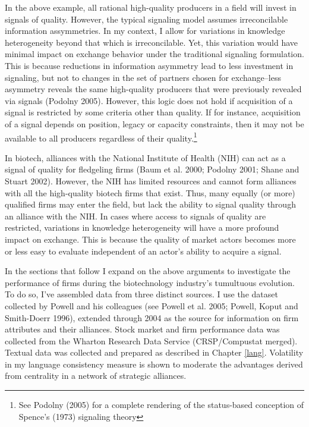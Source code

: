 In the above example, all rational high-quality producers in a field will invest in signals of quality. However, the typical signaling model assumes irreconcilable information assymmetries. In my context, I allow for variations in knowledge heterogeneity beyond that which is irreconcilable. Yet, this variation would have minimal impact on exchange behavior under the traditional signaling formulation. This is because reductions in information asymmetry lead to less investment in signaling, but not to changes in the set of partners chosen for exchange--less asymmetry reveals the same high-quality producers that were previously revealed via signals (Podolny 2005). However, this logic does not hold if acquisition of a signal is restricted by some criteria other than quality. If for instance, acquisition of a signal depends on position, legacy or capacity constraints, then it may not be available to all producers regardless of their quality.\footnote{See Podolny (2005) for a complete rendering of the status-based conception of Spence's (1973) signaling theory}

In biotech, alliances with the National Institute of Health (NIH) can act as a signal of quality for fledgeling firms (Baum et al. 2000; Podolny 2001; Shane and Stuart 2002). However, the NIH has limited resources and cannot form alliances with all the high-quality biotech firms that exist. Thus, many equally (or more) qualified firms may enter the field, but lack the ability to signal quality through an alliance with the NIH. In cases where access to signals of quality are restricted, variations in knowledge heterogeneity will have a more profound impact on exchange. This is because the quality of market actors becomes more or less easy to evaluate independent of an actor's ability to acquire a signal.

In the sections that follow I expand on the above arguments to investigate the performance of firms during the biotechnology industry's tumultuous evolution. To do so, I've assembled data from three distinct sources. I use the dataset collected by Powell and his colleagues (see Powell et al. 2005; Powell, Koput and Smith-Doerr 1996), extended through 2004 as the source for information on firm attributes and their alliances. Stock market and firm performance data was collected from the Wharton Research Data Service (CRSP/Compustat merged). Textual data was collected and prepared as described in Chapter \ref{lang}. Volatility in my language consistency measure is shown to moderate the advantages derived from centrality in a network of strategic alliances.

